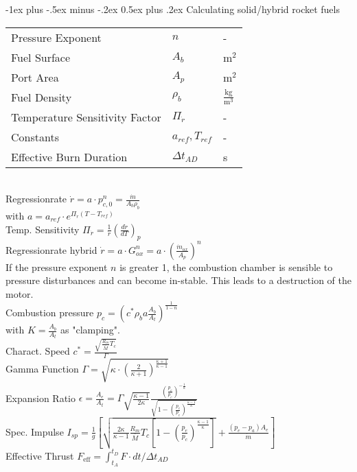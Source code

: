 \documentclass[10pt,landscape]{article}
\makeatletter
\renewcommand{\section}{\@startsection{section}{1}{0mm}%
                                {-1ex plus -.5ex minus -.2ex}%
                                {0.5ex plus .2ex}%
                                {\normalfont\large\bfseries}}
\makeatother
\begin{document}
\begin{multicols}{3}
\section{Calculating solid/hybrid rocket fuels}
\begin{tabular}{lll}
	Pressure Exponent & $n$ & - \\
	Fuel Surface & $A_b$ & $\text{m}^2$ \\
	Port Area & $A_p$ & $\text{m}^2$ \\
	Fuel Density & $\rho_b$ & $\frac{\text{kg}}{\text{m}^3}$ \\
	Temperature Sensitivity Factor & $\Pi_{\dot{r}}$ & - \\
	Constants & $a_{ref}, T_{ref}$ & - \\
	Effective Burn Duration & $\Delta t_{AD}$ & s \\
\end{tabular}\\
\vspace{7pt}
Regressionrate $\dot{r}=a\cdot p_{c,0}^n = \frac{\dot{m}}{A_b\rho_b}$\\
with $a = a_{ref}\cdot e^{\Pi_{\dot{r}} (T-T_{ref})}$\\
Temp. Sensitivity $\Pi_{\dot{r}} = \frac{1}{\dot{r}} (\frac{d \dot{r}}{d T})_p$ \\
\vspace{5pt}
Regressionrate hybrid $\dot{r}=a\cdot G_{ox}^n = a\cdot (\frac{\dot{m}_{ox}}{A_p})^n$\\
\vspace{5pt}
If the pressure exponent $n$ is greater 1, the combustion chamber is sensible to pressure disturbances and can become in-stable. This leads to a destruction of the motor.\\
\vspace{7pt}
Combustion pressure $p_c = (c^* \rho_b a \frac{A_b}{A_t})^\frac{1}{1-n}$\\
with $ K = \frac{A_b}{A_t}$ as "clamping".\\
\vspace{5pt}
Charact. Speed $c^* = \frac{\sqrt{\frac{R_m}{\bar{M}}T_c}}{\Gamma}$\\
\vspace{5pt}
Gamma Function $\Gamma = \sqrt{\kappa \cdot (\frac{2}{\kappa+1})^{\frac{\kappa+1}{\kappa-1}}}$\\
\vspace{5pt}
Expansion Ratio $\epsilon = \frac{A_e}{A_t} = \Gamma \sqrt{\frac{\kappa-1}{2 \kappa}} \frac{(\frac{p_e}{p_c})^{-\frac{1}{\kappa}}}{\sqrt{1-(\frac{p_e}{p_c})^\frac{\kappa-1}{\kappa}}}$\\
\vspace{5pt}
Spec. Impulse $I_{sp} = \frac{1}{g} \left[ \sqrt{\frac{2\kappa}{\kappa-1}\frac{R_m}{\bar{M}} T_c \left[1-(\frac{p_e}{p_c})^\frac{\kappa-1}{\kappa}\right]} + \frac{(p_e-p_a) A_e}{\dot{m}}\right]$\\
\vspace{5pt}
Effective Thrust $F_{\text{eff}}=\int_{t_A}^{t_D}F\cdot dt / \Delta t_{AD}$\\
\vspace{5pt}


\end{multicols}
\end{document}
